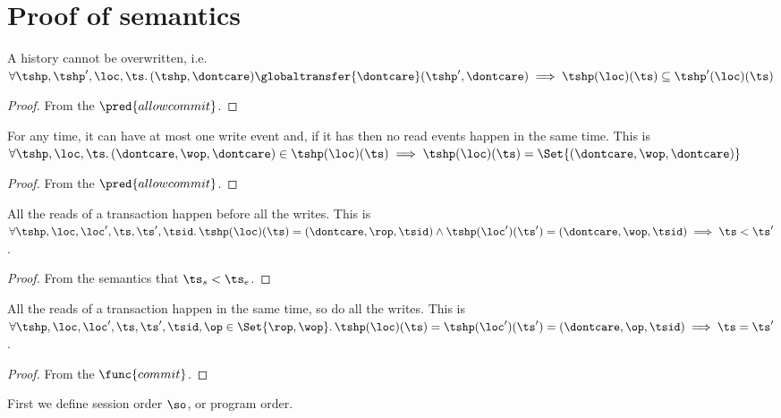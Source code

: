 \section{Proof of semantics}
\begin{lem}
    A history cannot be overwritten, i.e.\ \( \forall \tshp, \tshp', \loc, \ts \ldotp ( \tshp, \dontcare ) \globaltransfer{\dontcare} ( \tshp', \dontcare ) \implies \tshp(\loc)(\ts) \subseteq \tshp'(\loc)(\ts)\)
\end{lem}
\begin{proof}
    From the \( \pred{allowcommit} \).
\end{proof}

\begin{lem}
    For any time, it can have at most one write event and, if it has then no read events happen in the same time. This is \ \( \forall \tshp, \loc, \ts \ldotp ( \dontcare, \wop, \dontcare ) \in \tshp(\loc)(\ts) \implies \tshp(\loc)(\ts) =  \Set{( \dontcare, \wop, \dontcare )} \)
\end{lem}
\begin{proof}
    From the \( \pred{allowcommit} \).
\end{proof}


\begin{lem}
    \label{lem:read-before-write}
    All the reads of a transaction happen before all the writes. This is 
    \( \forall \tshp, \loc, \loc', \ts, \ts', \tsid \ldotp \tshp(\loc)(\ts) = (\dontcare, \rop, \tsid) \land \tshp(\loc')(\ts') = (\dontcare, \wop, \tsid) \implies \ts < \ts' \).
\end{lem}
\begin{proof}
    From the semantics that \( \ts_{s} < \ts_{e} \).
\end{proof}

\begin{lem}
    \label{lem:atoic-rw}
    All the reads of a transaction happen in the same time, so do all the writes. This is 
    \( \forall \tshp, \loc, \loc', \ts, \ts', \tsid, \op \in \Set{\rop, \wop} \ldotp \tshp(\loc)(\ts) =  \tshp(\loc')(\ts') = (\dontcare, \op, \tsid) \implies \ts = \ts' \).
\end{lem}
\begin{proof}
    From the \( \func{commit} \).
\end{proof}

First we define session order \( \so \), or program order.

